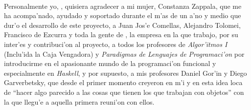 \documentclass[a4paper]{article}
\newcommand{\haskell}{\textsl{Haskell}}
\begin{document}
\paragraph{}Personalmente yo, , quisiera agradecer a mi mujer, Constanza Zappala, que me ha acompa'nado, ayudado y soportado durante el m'as de un a'no y medio que dur'o el desarrollo de este proyecto, a Juan Jos'e Comellas, Alejandro Tolomei, Francisco de Ezcurra y toda la gente de , la empresa en la que trabajo, por su inter'es y contribuci'on al proyecto, a todos los profesores de \textsl{Algor'itmos I} (Inclu'ida la Caja Vengadora) y \textsl{Paradigmas de Lenguajes de Programaci'on} por introducirme en el apasionante mundo de la programaci'on funcional y especialmente en \haskell, y por supuesto, a mis profesores Daniel Gor'in y Diego Garverbetsky, que desde el primer momento creyeron en m'i y en esta idea loca de ``hacer algo parecido a las cosas que tienen los que trabajan con objetos'' con la que llegu'e a aquella primera reuni'on con ellos.
\newpage

\end{document}
